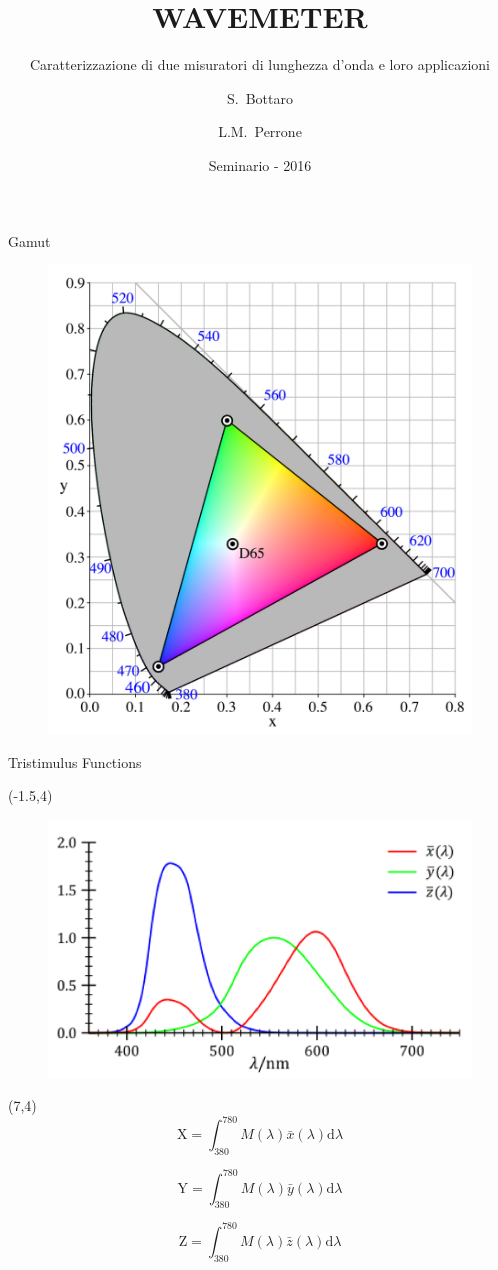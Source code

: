 \documentclass{beamer}
\title{WAVEMETER}
\subtitle{Caratterizzazione di due misuratori di lunghezza d'onda e loro applicazioni}
\author{S.~Bottaro\inst{1} \and L.M.~Perrone\inst{1}}
\institute[Unipi] %
{
  \inst{1}%
  Dipartimento di Fisica\\
  Università di Pisa
  }
\date{Seminario - 2016}
\begin{document}
\begin{frame}{Gamut}
\begin{figure}
\centering
\label{fig:8_CIExy1931_sRGB_gamut_D65}
\includegraphics[width=0.55\linewidth]{./8_CIExy1931_sRGB_gamut_D65}
\end{figure}
\end{frame}

\begin{frame}{Tristimulus Functions}



\begin{textblock}{12}(-1.5,4)
\begin{figure}
\centering
\includegraphics[width=0.7\linewidth]{./match_fun}
\label{fig:446px-CIE_1931_XYZ_Color_Matching_Functions}
\end{figure}
\end{textblock}


\begin{textblock}{8}(7,4)
\begin{equation}
\mathrm{X} = \int_{380}^{780} M(\lambda) \bar{x}(\lambda) \mathrm{d} \lambda
\end{equation}

\begin{equation}
\mathrm{Y} = \int_{380}^{780} M(\lambda) \bar{y}(\lambda) \mathrm{d} \lambda
\end{equation}

\begin{equation}
\mathrm{Z} = \int_{380}^{780} M(\lambda) \bar{z}(\lambda) \mathrm{d} \lambda
\end{equation}
\end{textblock}

\end{frame}
\end{document}
